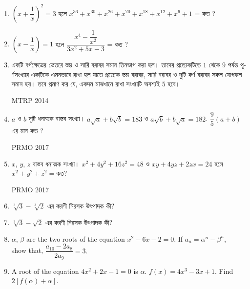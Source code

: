 \documentclass[11pt, a4paper]{article}
\begin{document}
\begin{enumerate}
	\item $ \left( x + \dfrac{1}{x} \right)^2 = 3 $ \textbengali{হলে} $ x^{36} + x^{30} + x^{26} + x^{20} + x^{18} + x^{12} + x^{6} + 1 $ = \textbengali{কত} ?
	
	\item $ \left( x - \dfrac{1}{x} \right) = 1$ \textbengali{হলে} $ \dfrac{x^4 - \dfrac{1}{x^2}}{3x^2 + 5x - 3} $ = \textbengali{কত} ?
	
	\item \textbengali{একটি বর্গক্ষেত্রের ভেতরে স্তম্ভ ও সারি বরাবর সমান তিনভাগ করা হল। তাদের প্রত্যেকটিতে} $1$ \textbengali{থেকে} $9$ \textbengali{পর্যন্ত পূর্ণসংখ্যার একটিকে এমনভাবে রাখা হল যাতে প্রত্যেক স্তম্ভ বরাবর, সারি বরাবর ও দুটি কর্ণ বরাবর সকল যোগফল সমান হয়। তবে প্রমাণ কর যে, একদম মাঝখানে রাখা সংখ্যাটি অবশ্যই} $5$ \textbengali{হবে।} 
	\begin{flushright}
		 MTRP 2014
	\end{flushright}
	
	\item $a$ \textbengali{ও} $b$ \textbengali{দুটি ধনাত্মক বাস্তব সংখ্যা।} $ a\sqrt{a} + b\sqrt{b} = 183 $ \textbengali{ও} $ a\sqrt{b} + b\sqrt{a} =182 $. $ \dfrac{9}{5} \left( a+b \right) $ \textbengali{এর মান কত ?}
	 \begin{flushright}
	 	PRMO 2017
	\end{flushright}	  
	
	
	\item $x$, $y$, $z$ \textbengali{বাস্তব ধনাত্মক সংখ্যা।} $x^2 + 4y^2 + 16z^2 = 48$ \textbengali{ও} $xy + 4yz + 2zx = 24$ \textbengali{হলে} $x^2 + y^2 + z^2 = $\textbengali{কত?}
	\begin{flushright}
	 	PRMO 2017
	\end{flushright}	
	
	
	\item $\sqrt[3]{3} - \sqrt[3]{2}$ \textbengali{এর করণী নিরসক উৎপাদক কী?}
	
	\item $\sqrt[3]{3} - \sqrt{2}$ \textbengali{এর করণী নিরসক উৎপাদক কী?}

	\item $\alpha$, $\beta$ are the two roots of the equation $x^2 -6x - 2 = 0$. If $a_n = \alpha^n - \beta^n$, \\ show that, $\dfrac{a_{10} - 2a_8}{2a_9} = 3.$
	
	\item A root of the equation $4x^2 + 2x - 1 = 0$ is $\alpha$. $f(x) = 4x^3 - 3x + 1$. Find $2[f(\alpha) + \alpha].$
	

\end{enumerate}
\end{document}
